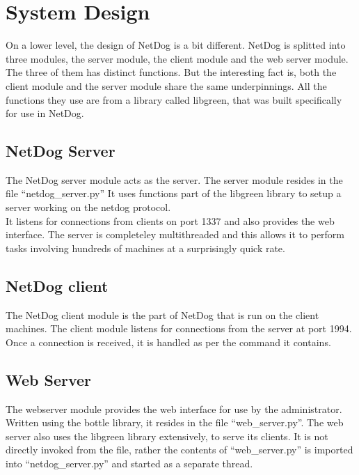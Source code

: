 \section{System Design}
\par
On a lower level, the design of NetDog is a bit different. NetDog is splitted
into three modules, the server module, the client module and the web server
module. The three of them has distinct functions. But the interesting fact is,
both the client module and the server module share the same underpinnings. All
the functions they use are from a library called libgreen, that was built
specifically for use in NetDog.


\subsection{NetDog Server}
\par
The NetDog server module acts as the server. The server module resides in the
file ``netdog\_server.py'' It uses functions part of the libgreen library to
setup a server working on the netdog protocol.\\

It listens for connections from clients on port 1337 and also provides the web
interface. The server is completeley multithreaded and this allows it to
perform tasks involving hundreds of machines at a surprisingly quick rate.

\subsection{NetDog client}
\par
The NetDog client module is the part of NetDog that is run on the client
machines. The client module listens for connections from the server at port
1994. Once a connection is received, it is handled as per the command it
contains.

\subsection{Web Server}
\par
The webserver module provides the web interface for use by the administrator.
Written using the bottle library, it resides in the file ``web\_server.py''. The
web server also uses the libgreen library extensively, to serve its clients. It
is not directly invoked from the file, rather the contents of ``web\_server.py''
is imported into ``netdog\_server.py'' and started as a separate thread.

